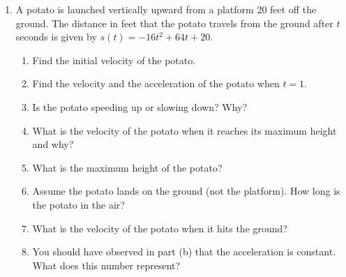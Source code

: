 \documentclass[11pt,fleqn]{article}
\begin{document}
\begin{enumerate}
\newpage
\item A potato is launched vertically upward from a platform 20 feet off the ground. The distance in feet that the potato travels from the ground after $t$ seconds is given by $s(t)=-16t^2+64t+20.$
	\begin{enumerate}
	\item Find the initial velocity of the potato.
	\vfill
	\item Find the velocity and the acceleration of the potato when $t=1.$ 	\vfill
	\item Is the potato speeding up or slowing down? Why?
	\vfill
	\item What is the velocity of the potato when it reaches its maximum height and why?
	\vfill
	\item What is the maximum height of the potato?
	\vfill
	\item Assume the potato lands on the ground (not the platform). How long is the potato in the air?
	\vfill
	\item What is the velocity of the potato when it hits the ground?
	\vfill
	\item You should have observed in part (b) that the acceleration is constant. What does this number represent? 
	\vfill
	\end{enumerate}
\end{enumerate}
\end{document}
